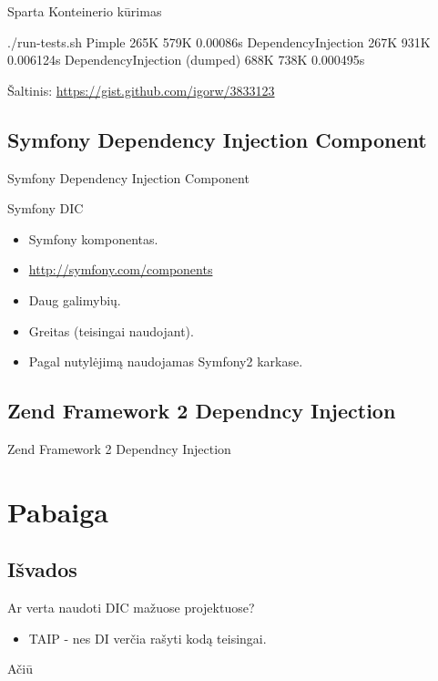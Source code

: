 \documentclass[12pt,a4paper]{beamer}
\begin{document}
\begin{frame}[fragile]{Sparta}
    Konteinerio kūrimas
    \vskip0.5cm
\begin{bashcode}
    ./run-tests.sh 
    Pimple
    265K
    579K
    0.00086s
    DependencyInjection
    267K
    931K
    0.006124s
    DependencyInjection (dumped)
    688K
    738K
    0.000495s
\end{bashcode}
    \vskip0.25cm
    \scriptsize{Šaltinis: \url{https://gist.github.com/igorw/3833123}}
\end{frame}


\subsection{Symfony Dependency Injection Component}
\begin{frame}
	\begin{center}
        {\Huge Symfony Dependency Injection Component}
	\end{center}
\end{frame}

\begin{frame}{Symfony DIC}
    \begin{itemize}
        \item Symfony komponentas.
        \item \url{http://symfony.com/components}
        \item Daug galimybių.
        \item Greitas (teisingai naudojant).
        \item Pagal nutylėjimą naudojamas Symfony2 karkase.
    \end{itemize}
\end{frame}

\subsection{Zend Framework 2 Dependncy Injection}
\begin{frame}
	\begin{center}
        {\Huge Zend Framework 2 Dependncy Injection}
	\end{center}
\end{frame}

\section{Pabaiga}

\subsection{Išvados}
\begin{frame}{Ar verta naudoti DIC mažuose projektuose?}
    \begin{itemize}
        \item TAIP - nes DI verčia rašyti kodą teisingai.
    \end{itemize}
\end{frame}
\begin{frame}
	\begin{center}
        {\Huge Ačiū}
	\end{center}
\end{frame}
\end{document}
